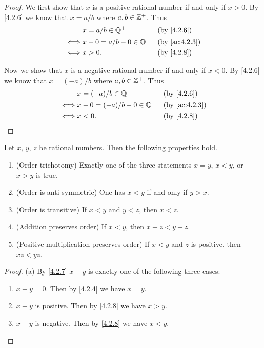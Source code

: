 \begin{proof}
  We first show that \(x\) is a positive rational number if and only if \(x > 0\).
  By \cref{4.2.6} we know that \(x = a / b\) where \(a, b \in \mathbb{Z}^+\).
  Thus
  \begin{align*}
         & x = a / b \in \Q^+         &  & \text{(by \cref{4.2.6})}    \\
    \iff & x - 0 = a / b - 0 \in \Q^+ &  & \text{(by \cref{ac:4.2.3})} \\
    \iff & x > 0.                     &  & \text{(by \cref{4.2.8})}
  \end{align*}

  Now we show that \(x\) is a negative rational number if and only if \(x < 0\).
  By \cref{4.2.6} we know that \(x = (-a) / b\) where \(a, b \in \mathbb{Z}^+\).
  Thus
  \begin{align*}
         & x = (-a) / b \in \Q^-         &  & \text{(by \cref{4.2.6})}    \\
    \iff & x - 0 = (-a) / b - 0 \in \Q^- &  & \text{(by \cref{ac:4.2.3})} \\
    \iff & x < 0.                        &  & \text{(by \cref{4.2.8})}
  \end{align*}
\end{proof}

\begin{prop}\label{4.2.9}
  Let \(x\), \(y\), \(z\) be rational numbers.
  Then the following properties hold.
  \begin{enumerate}
    \item (Order trichotomy)
          Exactly one of the three statements \(x = y\), \(x < y\), or \(x > y\) is true.
    \item (Order is anti-symmetric)
          One has \(x < y\) if and only if \(y > x\).
    \item (Order is transitive)
          If \(x < y\) and \(y < z\), then \(x < z\).
    \item (Addition preserves order)
          If \(x < y\), then \(x + z < y + z\).
    \item (Positive multiplication preserves order)
          If \(x < y\) and \(z\) is positive, then \(xz < yz\).
  \end{enumerate}
\end{prop}

\begin{proof}{(a)}
  By \cref{4.2.7} \(x - y\) is exactly one of the following three cases:
  \begin{enumerate}[label=(\Roman*)]
    \item \(x - y = 0\).
          Then by \cref{4.2.4} we have \(x = y\).
    \item \(x - y\) is positive.
          Then by \cref{4.2.8} we have \(x > y\).
    \item \(x - y\) is negative.
          Then by \cref{4.2.8} we have \(x < y\).
  \end{enumerate}
\end{proof}

